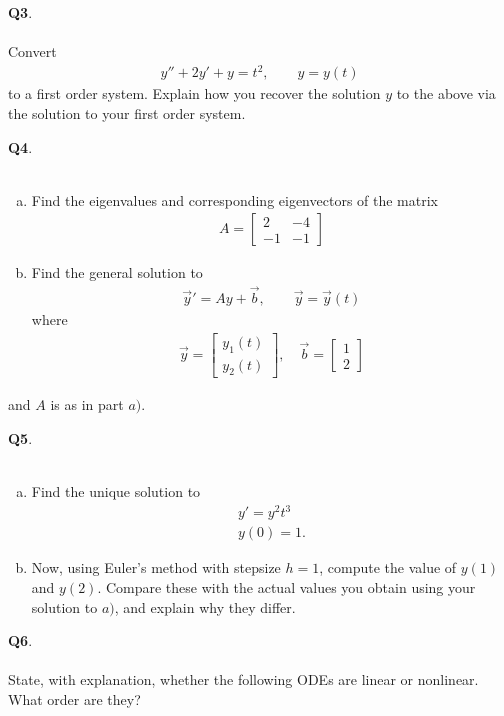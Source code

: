 \documentclass[12pt, oneside]{amsart}
\begin{document}
\newpage
\noindent
\textbf{Q3}. \\ \\ 
Convert
\begin{align*}
y'' + 2y' + y = t^2, \qquad y = y(t)
\end{align*}
to a first order system. Explain how you recover the solution $y$
to the above via the solution to your first order system.
        \newpage

\noindent
\textbf{Q4}. \\ \\ 
\begin{enumerate}[a)]
\item
Find the eigenvalues and corresponding eigenvectors of the matrix
\begin{align*}
A = \begin{bmatrix}
2 & -4 \\
-1 & -1
\end{bmatrix}
\end{align*}
\vspace{3in}
\item
Find the general solution to
\begin{align*}
\vec{y}' = Ay + \vec{b}, \qquad \vec{y} = \vec{y}(t)
\end{align*}
where
\begin{align*}
\vec{y} = \begin{bmatrix}
y_1(t) \\
y_2(t)
\end{bmatrix}, \quad
\vec{b} = \begin{bmatrix}
1 \\
2
\end{bmatrix}
\end{align*}
\end{enumerate}
and $A$ is as in part $a)$.
        \newpage

\noindent
\textbf{Q5}. \\ \\ 
\begin{enumerate}[a)]
	\item
Find the unique solution to
\begin{align*}
y' = y^2 t^3 \\
y(0)=1.
\end{align*}
\vspace{3in}
\item
Now, using Euler's method with stepsize $h = 1$, compute the value
of $y(1)$ and $y(2)$. Compare these
with the actual values you obtain using your
solution to $a)$, and explain why they differ.
\end{enumerate}
\newpage
\noindent
\textbf{Q6}. \\ \\ 
State, with explanation, whether the following ODEs are linear or nonlinear. What order are they?
\end{document}
